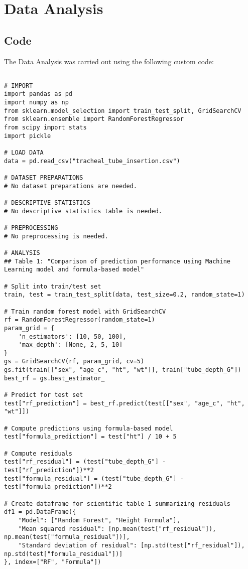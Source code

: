 \documentclass[11pt]{article}
\begin{document}
\section{Data Analysis}
\subsection{{Code}}
The Data Analysis was carried out using the following custom code:

\begin{verbatim}

# IMPORT
import pandas as pd
import numpy as np
from sklearn.model_selection import train_test_split, GridSearchCV
from sklearn.ensemble import RandomForestRegressor
from scipy import stats
import pickle

# LOAD DATA
data = pd.read_csv("tracheal_tube_insertion.csv")

# DATASET PREPARATIONS
# No dataset preparations are needed.

# DESCRIPTIVE STATISTICS
# No descriptive statistics table is needed.

# PREPROCESSING 
# No preprocessing is needed.

# ANALYSIS
## Table 1: "Comparison of prediction performance using Machine Learning model and formula-based model"

# Split into train/test set
train, test = train_test_split(data, test_size=0.2, random_state=1)

# Train random forest model with GridSearchCV
rf = RandomForestRegressor(random_state=1)
param_grid = {
    'n_estimators': [10, 50, 100],
    'max_depth': [None, 2, 5, 10]
}
gs = GridSearchCV(rf, param_grid, cv=5)
gs.fit(train[["sex", "age_c", "ht", "wt"]], train["tube_depth_G"])
best_rf = gs.best_estimator_

# Predict for test set
test["rf_prediction"] = best_rf.predict(test[["sex", "age_c", "ht", "wt"]])

# Compute predictions using formula-based model
test["formula_prediction"] = test["ht"] / 10 + 5

# Compute residuals
test["rf_residual"] = (test["tube_depth_G"] - test["rf_prediction"])**2
test["formula_residual"] = (test["tube_depth_G"] - test["formula_prediction"])**2

# Create dataframe for scientific table 1 summarizing residuals
df1 = pd.DataFrame({
    "Model": ["Random Forest", "Height Formula"],
    "Mean squared residual": [np.mean(test["rf_residual"]), np.mean(test["formula_residual"])],
    "Standard deviation of residual": [np.std(test["rf_residual"]), np.std(test["formula_residual"])]
}, index=["RF", "Formula"])


\end{verbatim}
\end{document}

